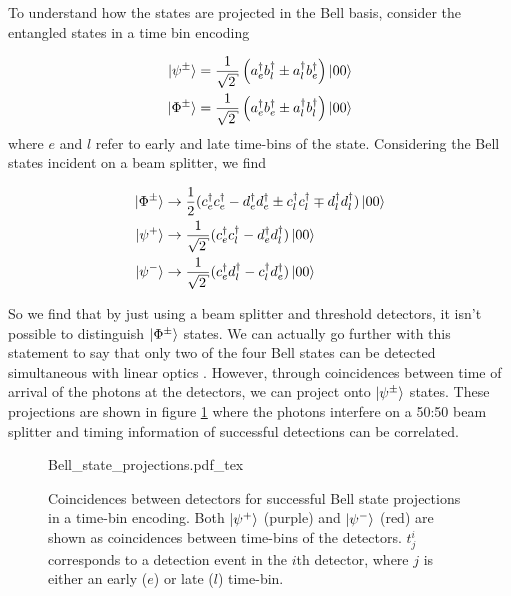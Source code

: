 To understand how the states are projected in the Bell basis, consider the entangled states in a time bin encoding 

\begin{align}
	\ket{\psi^\pm} &= \frac{1}{\sqrt{2}}\left(a^\dagger_e b^\dagger_l \pm a^\dagger_l b^\dagger_e\right)\ket{00}\\
	\ket{\Phi^\pm} &= \frac{1}{\sqrt{2}}\left(a^\dagger_e b^\dagger_e \pm a^\dagger_l b^\dagger_l\right)\ket{00}
\end{align}
where $e$ and $l$ refer to early and late time-bins of the state. Considering the Bell states incident on a beam splitter, we find

\begin{align}
	\ket{\Phi^\pm} &\rightarrow \frac{1}{2}(c^\dagger_e c^\dagger_e - d^\dagger_e d^\dagger_e \pm c^\dagger_l c^\dagger_l \mp d^\dagger_l d^\dagger_l)\ket{00}\\
	\ket{\psi^+} &\rightarrow \frac{1}{\sqrt{2}}(c^\dagger_e c^\dagger_l - d^\dagger_e d^\dagger_l) \ket{00}\\
	\ket{\psi^-} &\rightarrow \frac{1}{\sqrt{2}}(c^\dagger_e d^\dagger_l - c^\dagger_l d^\dagger_e) \ket{00}
\end{align}

So we find that by just using a beam splitter and threshold detectors, it isn't possible to distinguish $\ket{\Phi^\pm}$ states. We can actually go further with this statement to say that only two of the four Bell states can be detected simultaneous with linear optics \cite{walborn2003, Mattle1996}. However, through coincidences between time of arrival of the photons at the detectors, we can project onto $\ket{\psi^\pm}$ states. These projections are shown in figure \ref{fig:bell_state_projections} where the photons interfere on a {50:50} beam splitter and timing information of successful detections can be correlated.

\begin{figure}[tp]
	\centering
	\huge
	\def\svgwidth{0.8\textwidth} 
	{Bell_state_projections.pdf_tex}
	\caption[Bell state projections for time-bin encoding]{Coincidences between detectors for successful Bell state projections in a time-bin encoding. Both $\ket{\psi^+}$ (purple) and $\ket{\psi^-}$ (red) are shown as coincidences between time-bins of the detectors. $t^i_j$ corresponds to a detection event in the $i$th detector, where $j$ is either an early ($e$) or late ($l$) time-bin. }
	\label{fig:bell_state_projections}
\end{figure}


